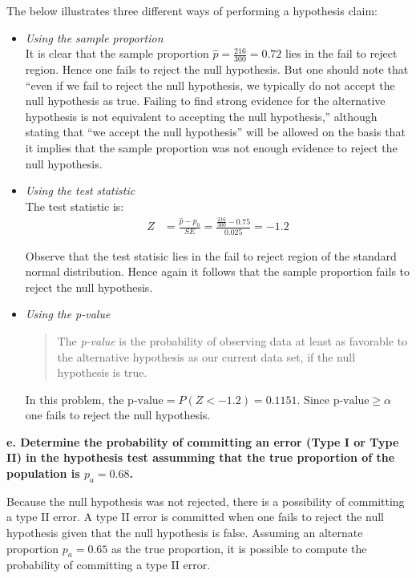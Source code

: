 \documentclass{article}
\begin{document}
The below illustrates three different ways of performing a hypothesis claim:
\vspace{0.1in}
\begin{itemize}
\item \textit{Using the sample proportion}\\
It is clear that the sample proportion $\hat{p}=\frac{216}{300}=0.72$ lies in the fail to reject region.  Hence one fails to reject the null hypothesis. But one should note that  ``even if we fail to reject 
the null hypothesis, we typically do not accept the null hypothesis as true. Failing to find strong evidence for the alternative hypothesis is not equivalent to accepting
the null hypothesis,''\cite{OS}  although stating that ``we accept the null hypothesis'' will be allowed on the basis that it implies that the sample proportion was not enough evidence to reject the null hypothesis.\\


\item \textit{Using the test statistic}\\
The test statistic is:
\begin{align*}
Z & = \frac{\hat{p}-p_0}{SE} = \frac{\frac{216}{300}-0.75}{0.025} = -1.2
\end{align*}

Observe that the test statisic lies in the fail to reject region of the standard normal distribution.  Hence again it follows that the sample proportion fails to reject the null hypothesis.\\


\item \textit{Using the p-value}\\
\begin{quote}
The \emph{p-value} is the probability of observing data at least as favorable to the alternative hypothesis as our current data set, if the null hypothesis is true.\cite{OS}
\end{quote}
In this problem, the $\text{p-value}=P(Z<-1.2)=0.1151$. Since $\text{p-value}\geq\alpha$ one fails to reject the null hypothesis.\\

\end{itemize}
\newpage

\textbf{e. Determine the probability of committing an error (Type I or Type II) in the hypothesis test assumming that the true proportion of the population is $p_a=0.68$.}

Because the null hypothesis was not rejected, there is a possibility of committing a type II error. A type II error is committed when one fails to reject the null hypothesis given that the null hypothesis is false.  Assuming an alternate proportion $p_a=0.65$ as the true proportion, it is possible to compute the probability of committing a type II error.\\
\end{document}
